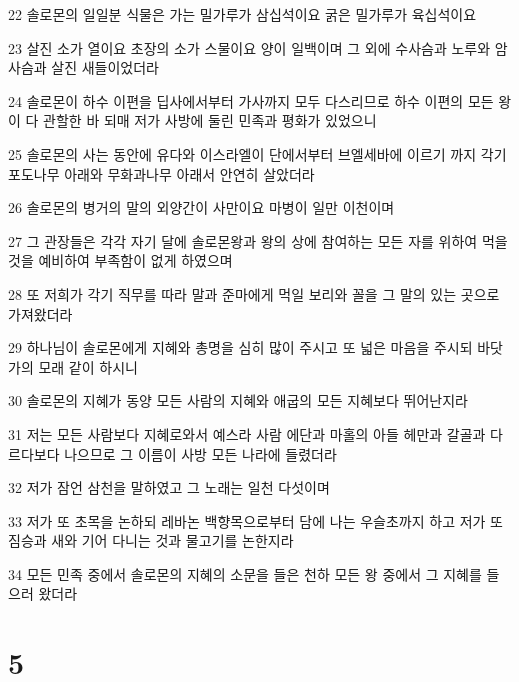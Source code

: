 \par 22 솔로몬의 일일분 식물은 가는 밀가루가 삼십석이요 굵은 밀가루가 육십석이요
\par 23 살진 소가 열이요 초장의 소가 스물이요 양이 일백이며 그 외에 수사슴과 노루와 암사슴과 살진 새들이었더라
\par 24 솔로몬이 하수 이편을 딥사에서부터 가사까지 모두 다스리므로 하수 이편의 모든 왕이 다 관할한 바 되매 저가 사방에 둘린 민족과 평화가 있었으니
\par 25 솔로몬의 사는 동안에 유다와 이스라엘이 단에서부터 브엘세바에 이르기 까지 각기 포도나무 아래와 무화과나무 아래서 안연히 살았더라
\par 26 솔로몬의 병거의 말의 외양간이 사만이요 마병이 일만 이천이며
\par 27 그 관장들은 각각 자기 달에 솔로몬왕과 왕의 상에 참여하는 모든 자를 위하여 먹을 것을 예비하여 부족함이 없게 하였으며
\par 28 또 저희가 각기 직무를 따라 말과 준마에게 먹일 보리와 꼴을 그 말의 있는 곳으로 가져왔더라
\par 29 하나님이 솔로몬에게 지혜와 총명을 심히 많이 주시고 또 넓은 마음을 주시되 바닷가의 모래 같이 하시니
\par 30 솔로몬의 지혜가 동양 모든 사람의 지혜와 애굽의 모든 지혜보다 뛰어난지라
\par 31 저는 모든 사람보다 지혜로와서 예스라 사람 에단과 마홀의 아들 헤만과 갈골과 다르다보다 나으므로 그 이름이 사방 모든 나라에 들렸더라
\par 32 저가 잠언 삼천을 말하였고 그 노래는 일천 다섯이며
\par 33 저가 또 초목을 논하되 레바논 백향목으로부터 담에 나는 우슬초까지 하고 저가 또 짐승과 새와 기어 다니는 것과 물고기를 논한지라
\par 34 모든 민족 중에서 솔로몬의 지혜의 소문을 들은 천하 모든 왕 중에서 그 지혜를 들으러 왔더라

\chapter{5}

